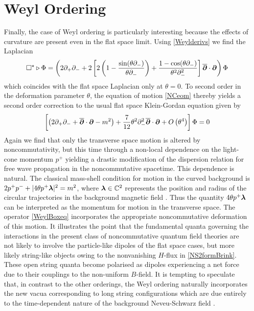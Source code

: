 \section{Weyl Ordering}
\label{ScalarWeyl}
Finally, the case of Weyl ordering is particularly interesting because the
effects of curvature are present even in the flat space limit. Using
\eqref{Weylderivs} we find the Laplacian
\begin{equation}
  \label{WeylBoxeq}
  \Box^\star\triangleright\Phi=\left(2 \partial_+ \partial_-
    +2 \left[2 \left(1-\frac{\sin(\theta \partial_-)}
        {\theta \partial_-}\right)+\frac{1-\cos(\theta \partial_-)}
      {\theta^2 \partial_-^2}\right] \overline{{{\boldsymbol {\partial} }}}\cdot{{\boldsymbol {\partial} }}
  \right)\Phi
\end{equation}
which coincides with the flat space Laplacian only at $\theta=0$. To
second order in the deformation parameter $\theta$, the equation of
motion \eqref{NCeom} thereby yields a second order correction to the
usual flat space Klein-Gordan equation given by
\begin{equation}
  \label{KGeqcorr}
  \left[\left(2 \partial_+ \partial_-+\overline{{{\boldsymbol {\partial} }}}\cdot{{\boldsymbol {\partial} }}-m^2
    \right)+ \frac7{12}  \theta^2 \partial_-^2 \overline{{{\boldsymbol {\partial} }}}\cdot
    {{\boldsymbol {\partial} }}+O\left(\theta^4\right)\right]\Phi=0  
\end{equation}
Again we find that only the transverse space motion is altered by
noncommutativity, but this time through a non-local dependence on the light-cone
momentum $p^+$ yielding a drastic modification of the dispersion relation for
free wave propagation in the noncommutative spacetime. This dependence is
natural. The classical mass-shell condition for motion in the curved background
is $2 p^+ p^-+|4 \theta p^+ {\boldsymbol {\lambda} }|^2=m^2$, where ${\boldsymbol {\lambda} }\in{\mathbb C}^2$
represents the position and radius of the circular trajectories in the
background magnetic field \cite{CFS1}. Thus the quantity $4 \theta p^+
{\boldsymbol {\lambda} }$ can be interpreted as the momentum for motion in the transverse
space. The operator \eqref{WeylBoxeq} incorporates the appropriate
noncommutative deformation of this motion. It illustrates the point that the
fundamental quanta governing the interactions in the present class of
noncommutative quantum field theories are not likely to involve the
particle-like dipoles of the flat space cases, but more likely string-like
objects owing to the nonvanishing $H$-flux in \eqref{NS2formBrink}. These open
string quanta become polarised as dipoles experiencing a net force due to their
couplings to the non-uniform $B$-field. It is tempting to speculate that, in
contrast to the other orderings, the Weyl ordering naturally incorporates the
new vacua corresponding to long string configurations which are due entirely to
the time-dependent nature of the background Neveu-Schwarz field \cite{BAKZ1}.

